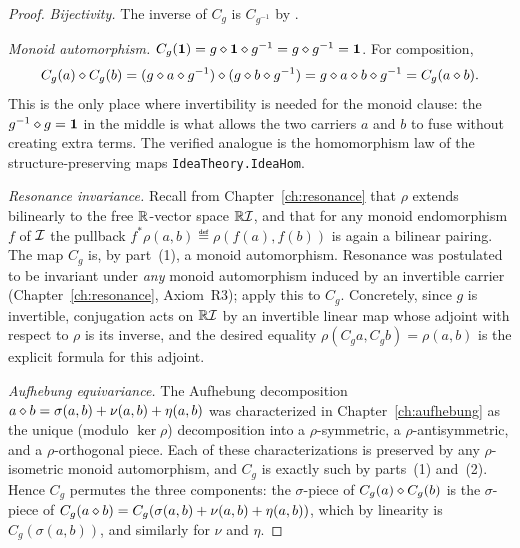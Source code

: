 \begin{proof}
\emph{Bijectivity.} The inverse of $C_g$ is $C_{g^{-1}}$ by
.

\emph{Monoid automorphism.} $C_g(\mathbf{1}) = g\mathbin{\diamond}\mathbf{1}\mathbin{\diamond} g^{-1}
= g\mathbin{\diamond} g^{-1} = \mathbf{1}$. For composition,
\[
C_g(a)\mathbin{\diamond} C_g(b) = (g\mathbin{\diamond} a\mathbin{\diamond} g^{-1})\mathbin{\diamond}
  (g\mathbin{\diamond} b\mathbin{\diamond} g^{-1}) = g\mathbin{\diamond} a\mathbin{\diamond} b\mathbin{\diamond} g^{-1}
  = C_g(a\mathbin{\diamond} b).
\]
This is the only place where invertibility is needed for the monoid
clause: the $g^{-1}\mathbin{\diamond} g = \mathbf{1}$ in the middle is what allows the
two carriers $a$ and $b$ to fuse without creating extra terms. The
verified analogue is the homomorphism law of the structure-preserving
maps \texttt{IdeaTheory.IdeaHom}.

\emph{Resonance invariance.} Recall from Chapter~\ref{ch:resonance} that
$\rho$ extends bilinearly to the free $\mathbb{R}$-vector space $\mathbb{R}\mathcal{I}$,
and that for any monoid endomorphism $f$ of $\mathcal{I}$ the pullback
$f^{*}\rho(a,b)\eqdef \rho(f(a),f(b))$ is again a bilinear pairing. The
map $C_g$ is, by part~(1), a monoid automorphism. Resonance was
postulated to be invariant under \emph{any} monoid automorphism induced
by an invertible carrier (Chapter~\ref{ch:resonance}, Axiom~R3); apply
this to $C_g$. Concretely, since $g$ is invertible, conjugation acts on
$\mathbb{R}\mathcal{I}$ by an invertible linear map whose adjoint with respect to
$\rho$ is its inverse, and the desired equality
$\rho(C_g a, C_g b) = \rho(a,b)$ is the explicit formula for this
adjoint.

\emph{Aufhebung equivariance.} The Aufhebung decomposition
$a\mathbin{\diamond} b = \sigma(a,b) + \nu(a,b) + \eta(a,b)$ was characterized in
Chapter~\ref{ch:aufhebung} as the unique (modulo $\ker\rho$)
decomposition into a $\rho$-symmetric, a $\rho$-antisymmetric, and a
$\rho$-orthogonal piece. Each of these characterizations is preserved
by any $\rho$-isometric monoid automorphism, and $C_g$ is exactly such
by parts~(1) and~(2). Hence $C_g$ permutes the three components: the
$\sigma$-piece of $C_g(a)\mathbin{\diamond} C_g(b)$ is the $\sigma$-piece of
$C_g(a\mathbin{\diamond} b) = C_g(\sigma(a,b)+\nu(a,b)+\eta(a,b))$, which by
linearity is $C_g(\sigma(a,b))$, and similarly for $\nu$ and $\eta$.


\end{proof}
